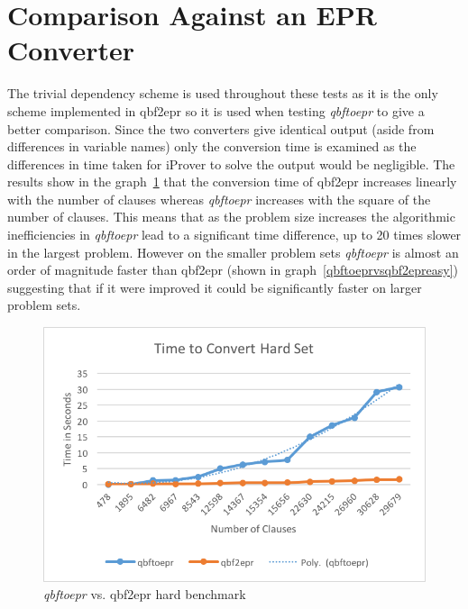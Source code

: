 \section{Comparison Against an EPR Converter}
The trivial dependency scheme is used throughout these tests as it is the only scheme implemented in qbf2epr so it is used when testing \textit{qbftoepr} to give a better comparison. Since the two converters give identical output (aside from differences in variable names) only the conversion time is examined as the differences in time taken for iProver to solve the output would be negligible. The results show in the graph~\ref{qbftoeprvsqbf2eprhard} that the conversion time of qbf2epr increases linearly with the number of clauses whereas \textit{qbftoepr} increases with the square of the number of clauses. This means that as the problem size increases the algorithmic inefficiencies in \textit{qbftoepr} lead to a significant time difference, up to 20 times slower in the largest problem. However on the smaller problem sets \textit{qbftoepr} is almost an order of magnitude faster than qbf2epr (shown in graph~\ref{qbftoeprvsqbf2epreasy}) suggesting that if it were improved it could be significantly faster on larger problem sets.

\begin{figure}[h]
\caption{\textit{qbftoepr} vs. qbf2epr hard benchmark}
\label{qbftoeprvsqbf2eprhard}
\begin{CenteredBox}
\includegraphics{qbftoeprvsqbf2eprhard.png}
\end{CenteredBox}
\end{figure}

